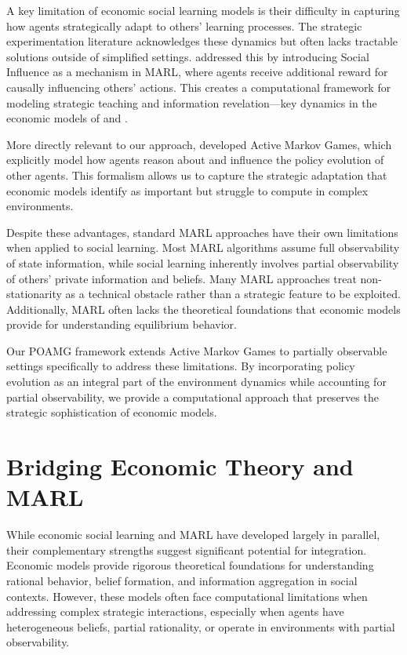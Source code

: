 A key limitation of economic social learning models is their difficulty in capturing how agents strategically adapt to others' learning processes. The strategic experimentation literature acknowledges these dynamics but often lacks tractable solutions outside of simplified settings. \citet{jaques2019social} addressed this by introducing Social Influence as a mechanism in MARL, where agents receive additional reward for causally influencing others' actions. This creates a computational framework for modeling strategic teaching and information revelation—key dynamics in the economic models of \citet{bolton1999strategic} and \citet{heidhues2015strategic}.

More directly relevant to our approach, \citet{kim2022influencing} developed Active Markov Games, which explicitly model how agents reason about and influence the policy evolution of other agents. This formalism allows us to capture the strategic adaptation that economic models identify as important but struggle to compute in complex environments.

Despite these advantages, standard MARL approaches have their own limitations when applied to social learning. Most MARL algorithms assume full observability of state information, while social learning inherently involves partial observability of others' private information and beliefs. Many MARL approaches treat non-stationarity as a technical obstacle rather than a strategic feature to be exploited. Additionally, MARL often lacks the theoretical foundations that economic models provide for understanding equilibrium behavior.

Our POAMG framework extends Active Markov Games to partially observable settings specifically to address these limitations. By incorporating policy evolution as an integral part of the environment dynamics while accounting for partial observability, we provide a computational approach that preserves the strategic sophistication of economic models.

\section{Bridging Economic Theory and MARL}

While economic social learning and MARL have developed largely in parallel, their complementary strengths suggest significant potential for integration. Economic models provide rigorous theoretical foundations for understanding rational behavior, belief formation, and information aggregation in social contexts. However, these models often face computational limitations when addressing complex strategic interactions, especially when agents have heterogeneous beliefs, partial rationality, or operate in environments with partial observability. 

